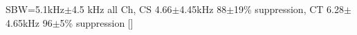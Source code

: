 
 SBW=5.1kHz$\pm$4.5 kHz all Ch, CS 4.66$\pm$4.45kHz 88$\pm$19\% suppression, CT 6.28$\pm$ 4.65kHz    96$\pm$5\% suppression [\citep{RhodeGreenberg:1994}]





